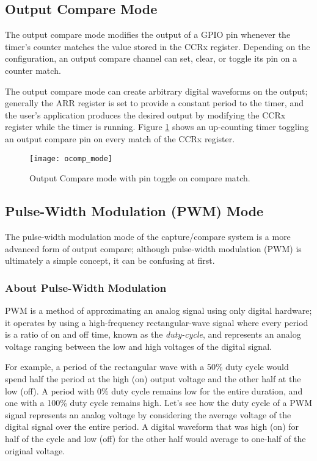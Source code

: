 \documentclass[openany,11pt,fleqn]{book} %
\begin{document}
    
    \subsection{Output Compare Mode}
        The output compare mode modifies the output of a GPIO pin whenever the timer's counter matches the value stored in the CCRx register. Depending on the configuration, an output compare channel can set, clear, or toggle its pin on a counter match. 
        
        The output compare mode can create arbitrary digital waveforms on the output; generally the ARR register is set to provide a constant period to the timer, and the user's application produces the desired output by modifying the CCRx register while the timer is running. Figure \ref{ocomp_mode} shows an up-counting timer toggling an output compare pin on every match of the CCRx register. 

        \begin{figure}[]
            \centering\texttt{[image: ocomp\_mode]}
            \caption{Output Compare mode with pin toggle on compare match.}
            \label{ocomp_mode}
        \end{figure}
    
    
    \subsection{Pulse-Width Modulation (PWM) Mode}
    The pulse-width modulation mode of the capture/compare system is a more advanced form of output compare; although pulse-width modulation (PWM) is ultimately a simple concept, it can be confusing at first. 
    
    \subsubsection{\color{orange}About Pulse-Width Modulation}
    PWM is a method of approximating an analog signal using only digital hardware; it operates by using a high-frequency rectangular-wave signal where every period is a ratio of on and off time, known as the \textit{duty-cycle}, and represents an analog voltage ranging between the low and high voltages of the digital signal. 
    
    For example, a period of the rectangular wave with a 50\% duty cycle would spend half the period at the high (on) output voltage and the other half at the low (off). A period with 0\% duty cycle remains low for the entire duration, and one with a 100\% duty cycle remains high. Let's see how the duty cycle of a PWM signal represents an analog voltage by considering the average voltage of the digital signal over the entire period. A digital waveform that was high (on) for half of the cycle and low (off) for the other half would average to one-half of the original voltage.  
    
\end{document}
